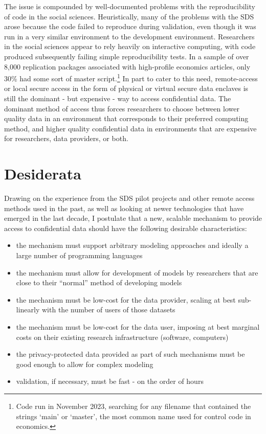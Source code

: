 \documentclass[]{hdsr}
\begin{document}
The issue is compounded by well-documented problems with the reproducibility of code in the social sciences. Heuristically, many of the problems with the SDS arose because the code failed to reproduce during validation, even though it was  run in a very similar environment to the development environment. Researchers in the social sciences appear to rely heavily on interactive computing, with code produced subsequently failing simple reproducibility tests. In a sample of over 8,000 replication packages associated with high-profile economics articles, only 30\% had some sort of master script.\footnote{Code run in November 2023, searching for any filename that contained the strings `main' or `master', the most common name used for control code in economics.} In part to cater to this need, remote-access or local secure access in the form of physical or virtual secure data enclaves is still the dominant - but expensive - way to access confidential data. The dominant method of access thus forces researchers to choose between lower quality data in an environment that corresponds to their preferred computing method, and higher quality confidential data in environments that are expensive for researchers, data providers, or both.

\section{Desiderata}
\label{sec:desiderata}

Drawing on the experience from the SDS pilot projects and other remote access methods used in the past, as well as looking at newer technologies that have emerged in the last decade, I postulate that a new, scalable mechanism to provide access to confidential data should have the following desirable characteristics:

\begin{itemize}
    \item the mechanism must support arbitrary modeling approaches and ideally a large number of programming languages
    \item the mechanism must allow for development of models by researchers that are close to their ``normal'' method of developing models
    \item the mechanism must be low-cost for the data provider, scaling at best sub-linearly with the number of users of those datasets
    \item the mechanism must be low-cost for the data user, imposing at best marginal costs on their existing research infrastructure (software, computers)
    \item the privacy-protected data provided as part of such mechanisms must be good enough to allow for complex modeling
    \item validation, if necessary, must be fast - on the order of hours
\end{itemize}
\end{document}
